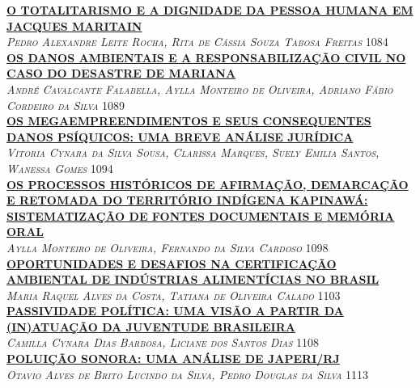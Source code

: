 \noindent \textsc{\hyperlink{trabalhos/250423.pdf.1}{\textbf{O TOTALITARISMO E A DIGNIDADE DA PESSOA HUMANA EM JACQUES MARITAIN }}}\\ 
\noindent \textsc{\textit{Pedro Alexandre Leite Rocha, Rita de Cássia Souza Tabosa Freitas}} \hfill 1084\\ 

\noindent \textsc{\hyperlink{trabalhos/250318.pdf.1}{\textbf{OS DANOS AMBIENTAIS E A RESPONSABILIZAÇÃO CIVIL NO CASO DO DESASTRE DE MARIANA}}}\\ 
\noindent \textsc{\textit{André Cavalcante Falabella, Aylla Monteiro de Oliveira, Adriano Fábio Cordeiro da Silva}} \hfill 1089\\ 

\noindent \textsc{\hyperlink{trabalhos/249574.pdf.1}{\textbf{OS MEGAEMPREENDIMENTOS E SEUS CONSEQUENTES DANOS PSÍQUICOS: UMA BREVE ANÁLISE JURÍDICA}}}\\ 
\noindent \textsc{\textit{Vitoria Cynara da Silva Sousa, Clarissa Marques, Suely Emilia Santos, Wanessa  Gomes}} \hfill 1094\\ 

\noindent \textsc{\hyperlink{trabalhos/249290.pdf.1}{\textbf{OS PROCESSOS HISTÓRICOS DE AFIRMAÇÃO, DEMARCAÇÃO E RETOMADA DO TERRITÓRIO INDÍGENA KAPINAWÁ: SISTEMATIZAÇÃO DE FONTES DOCUMENTAIS E MEMÓRIA ORAL}}}\\ 
\noindent \textsc{\textit{Aylla Monteiro de Oliveira, Fernando da Silva Cardoso}} \hfill 1098\\ 

\noindent \textsc{\hyperlink{trabalhos/249551.pdf.1}{\textbf{OPORTUNIDADES E DESAFIOS NA CERTIFICAÇÃO AMBIENTAL DE INDÚSTRIAS ALIMENTÍCIAS NO BRASIL}}}\\ 
\noindent \textsc{\textit{Maria Raquel Alves da Costa, Tatiana de Oliveira Calado}} \hfill 1103\\ 

\noindent \textsc{\hyperlink{trabalhos/251439.pdf.1}{\textbf{PASSIVIDADE POLÍTICA: UMA VISÃO A PARTIR DA (IN)ATUAÇÃO DA JUVENTUDE BRASILEIRA }}}\\ 
\noindent \textsc{\textit{Camilla Cynara Dias Barbosa, Liciane dos Santos Dias}} \hfill 1108\\ 

\noindent \textsc{\hyperlink{trabalhos/250288.pdf.1}{\textbf{POLUIÇÃO SONORA: UMA ANÁLISE DE JAPERI/RJ}}}\\ 
\noindent \textsc{\textit{Otavio Alves de Brito Lucindo da Silva, Pedro Douglas da Silva}} \hfill 1113\\ 

